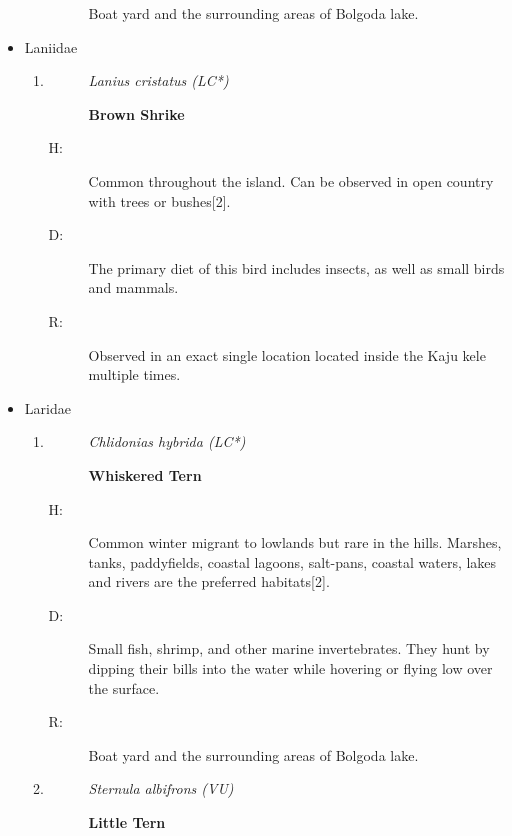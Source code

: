 \begin{itemize}
\begin{enumerate}
\begin{description}
Boat yard and the surrounding areas of Bolgoda lake.%
\end{description}%
\end{enumerate}%
\item%
Laniidae%
\begin{enumerate}%
\item%
\begin{description}%
\item[]%
\textit{Lanius cristatus (LC*)}%
\item[]%
\textbf{Brown Shrike}%
\end{description}%
\begin{description}%
\item[H: ]%
Common throughout the island. Can be observed in open country with trees or bushes{[}2{]}.%
\item[D: ]%
The primary diet of this bird includes insects, as well as small birds and mammals.%
\item[R: ]%
Observed in an exact single location located inside the Kaju kele multiple times.%
\end{description}%
\end{enumerate}%
\item%
Laridae%
\begin{enumerate}%
\item%
\begin{description}%
\item[]%
\textit{Chlidonias hybrida (LC*)}%
\item[]%
\textbf{Whiskered Tern}%
\end{description}%
\begin{description}%
\item[H: ]%
Common winter migrant to lowlands but rare in the hills. Marshes, tanks, paddyfields, coastal lagoons, salt{-}pans, coastal waters, lakes and rivers are the preferred habitats{[}2{]}.%
\item[D: ]%
Small fish, shrimp, and other marine invertebrates. They hunt by dipping their bills into the water while hovering or flying low over the surface.%
\item[R: ]%
Boat yard and the surrounding areas of Bolgoda lake.%
\end{description}%
\item%
\begin{description}%
\item[]%
\textit{Sternula albifrons (VU)}%
\item[]%
\textbf{Little Tern}%
\end{description}%

\end{enumerate}
\end{itemize}
